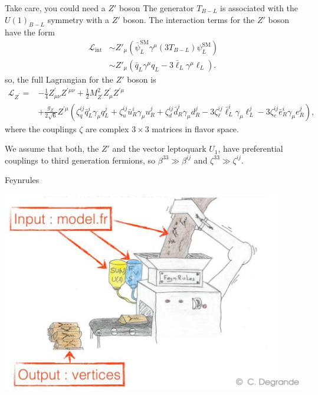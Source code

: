 \documentclass{bredelebeamer}
\begin{document}
\begin{frame}{Take care, you could need a $Z'$ boson}
	The generator $T_{B-L}$ is associated with the $U(1)_{B-L}$ symmetry with a $Z'$ boson. The interaction terms for the $Z'$ boson have the form
	\begin{align*}
		\mathcal{L}_{\text{int}} &\sim Z'_\mu\left(\bar{\psi}_{L}^{\mathrm{SM}}\gamma^\mu (3T_{B-L}) \psi_{L}^{\mathrm{SM}}\right)\\
		&\sim Z'_\mu \left(\bar q_{L} \gamma^\mu q_{L} - 3 \bar \ell_L \gamma^\mu \ell_L\right).
	\end{align*}\pause
	so, the full Lagrangian for the $Z'$ boson is
	\begin{equation}
		\begin{aligned}
		\mathcal{L}_{Z^{\prime}}= & -\frac{1}{4} Z_{\mu \nu}^{\prime} Z^{\prime \mu \nu} +\frac{1}{2} M_{Z^{\prime}}^2 Z_\mu^{\prime} Z^{\prime \mu} \\
		& +\frac{g_{Z^{\prime}} }{2 \sqrt{6}} Z^{\prime \mu}\left(\zeta_q^{i j} \bar{q}_L^i \gamma_\mu q_L^j+\zeta_u^{i j} \bar{u}_R^i \gamma_\mu u_R^j+\zeta_d^{i j} \bar{d}_R^i \gamma_\mu d_R^j-3 \zeta_{\ell}^{i j} \bar{\ell}_L^i \gamma_\mu \ell_L^j-3 \zeta_e^{i j} \bar{e}_R^i \gamma_\mu e_R^j\right),
		\end{aligned}
	\end{equation}
	where the couplings $\zeta$ are complex $3\times 3$ matrices in flavor space.\pause

	\vfill
	We assume that both, the $Z'$ and the vector leptoquark $U_1$, have preferential couplings to third generation fermions, so $\beta^{33}\gg \beta^{ij}$ and $\zeta^{33}\gg \zeta^{ij}$.
\end{frame}

\begin{frame}{Feynrules}
	\begin{center}
		\includegraphics[width=.99\linewidth]{Feynrules.png}
	\end{center}
\end{frame}
\end{document}

